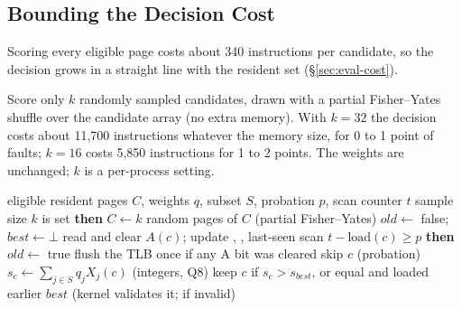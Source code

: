 \subsection{Bounding the Decision Cost}
\label{sec:design-cost}

 Scoring every eligible page costs about 340 instructions per
candidate, so the decision grows in a straight line with the resident set
(\S\ref{sec:eval-cost}).

 Score only $k$ randomly sampled candidates, drawn with a partial
Fisher--Yates shuffle over the candidate array (no extra memory). With $k=32$ the
decision costs about 11,700 instructions whatever the memory size, for 0 to 1 point of
faults; $k=16$ costs 5,850 instructions for 1 to 2 points. The weights are unchanged;
$k$ is a per-process setting.

\begin{algorithm}[t]
\caption{\sys victim selection (\texttt{choose\_ml}), one eviction}
\label{alg:choose}
\begin{algorithmic}
 eligible resident pages $C$, weights $q$, subset $S$, probation $p$, scan counter $t$
 sample size $k$ is set {\bfseries then} $C \leftarrow k$ random pages of $C$ \hfill (partial Fisher--Yates)
\STATE $old \leftarrow$ false; \ $best \leftarrow \bot$
  \STATE read and clear $A(c)$; update , , last-seen scan
   $t - \mathrm{load}(c) \ge p$ {\bfseries then} $old \leftarrow$ true
\ENDFOR
\STATE flush the TLB once if any A bit was cleared
    \STATE skip $c$ \hfill (probation)
  \ENDIF
  \STATE $s_c \leftarrow \sum_{j\in S} q_j X_j(c)$ \hfill (integers, Q8)
  \STATE keep $c$ if $s_c > s_{best}$, or equal and loaded earlier
\ENDFOR
{} $best$ \hfill (kernel validates it; \clock if invalid)
\end{algorithmic}
\end{algorithm}
